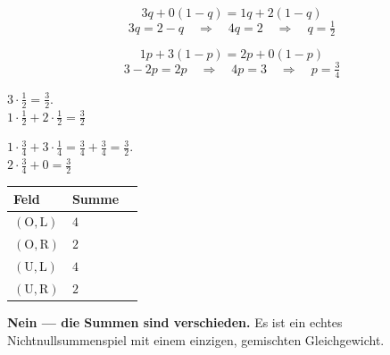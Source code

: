 \begin{aufgabe}
\[ 3q + 0(1-q) = 1q + 2(1-q) \]
\[ 3q = 2 - q \quad\Longrightarrow\quad 4q = 2 \quad\Longrightarrow\quad q = \tfrac12 \]

\[ 1p + 3(1-p) = 2p + 0(1-p) \]
\[ 3 - 2p = 2p \quad\Longrightarrow\quad 4p = 3 \quad\Longrightarrow\quad p = \tfrac34 \]

 $3\cdot\tfrac12 = \tfrac32$.\\
 $1\cdot\tfrac12 + 2\cdot\tfrac12 = \tfrac32$ \checkmark

 $1\cdot\tfrac34 + 3\cdot\tfrac14 = \tfrac34+\tfrac34 = \tfrac32$.\\
 $2\cdot\tfrac34 + 0 = \tfrac32$ \checkmark

\begin{center}
\renewcommand{\arraystretch}{1.46}
\begin{tabular}{@{}P{2.0cm}P{2.0cm}P{2.4cm}@{}}
\toprule
\textbf{Feld} & \textbf{Summe} & \\
\midrule
$(\text{O},\text{L})$ & $4$ & \\
$(\text{O},\text{R})$ & $2$ & \\
$(\text{U},\text{L})$ & $4$ & \\
$(\text{U},\text{R})$ & $2$ & \\
\bottomrule
\end{tabular}
\end{center}

\begin{center}
\begin{minipage}{0.9\textwidth}
\textbf{Nein --- die Summen sind verschieden.} Es ist ein echtes Nichtnullsummenspiel mit einem einzigen, gemischten Gleichgewicht.
\end{minipage}
\end{center}

\begin{center}
\begin{minipage}{0.88\textwidth}
\end{minipage}
\end{center}
\end{aufgabe}

